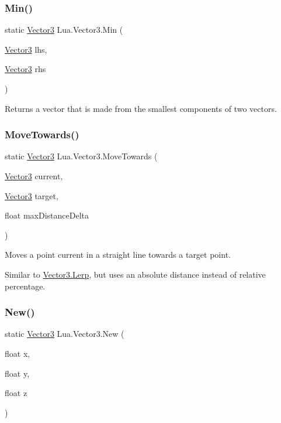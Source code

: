 \subsubsection{\texorpdfstring{Min()}{Min()}}
{\footnotesize\ttfamily static \mbox{\hyperlink{class_lua_1_1_vector3}{Vector3}} Lua.\+Vector3.\+Min (\begin{DoxyParamCaption}\item[{\mbox{\hyperlink{class_lua_1_1_vector3}{Vector3}}}]{lhs,  }\item[{\mbox{\hyperlink{class_lua_1_1_vector3}{Vector3}}}]{rhs }\end{DoxyParamCaption})\hspace{0.3cm}{\ttfamily [static]}}



Returns a vector that is made from the smallest components of two vectors. 

\mbox{\label{class_lua_1_1_vector3_aa4b2a5ff6af794cc8a83617227bee73b}} 
\subsubsection{\texorpdfstring{MoveTowards()}{MoveTowards()}}
{\footnotesize\ttfamily static \mbox{\hyperlink{class_lua_1_1_vector3}{Vector3}} Lua.\+Vector3.\+Move\+Towards (\begin{DoxyParamCaption}\item[{\mbox{\hyperlink{class_lua_1_1_vector3}{Vector3}}}]{current,  }\item[{\mbox{\hyperlink{class_lua_1_1_vector3}{Vector3}}}]{target,  }\item[{float}]{max\+Distance\+Delta }\end{DoxyParamCaption})\hspace{0.3cm}{\ttfamily [static]}}



Moves a point current in a straight line towards a target point. 

Similar to \mbox{\hyperlink{class_lua_1_1_vector3_a2ac180084d2490e519612ccba40da454}{Vector3.\+Lerp}}, but uses an absolute distance instead of relative percentage. \mbox{\label{class_lua_1_1_vector3_ad6514c4819aa2dabb95253f9d6f5248c}} 
\subsubsection{\texorpdfstring{New()}{New()}}
{\footnotesize\ttfamily static \mbox{\hyperlink{class_lua_1_1_vector3}{Vector3}} Lua.\+Vector3.\+New (\begin{DoxyParamCaption}\item[{float}]{x,  }\item[{float}]{y,  }\item[{float}]{z }\end{DoxyParamCaption})\hspace{0.3cm}{\ttfamily [static]}}



